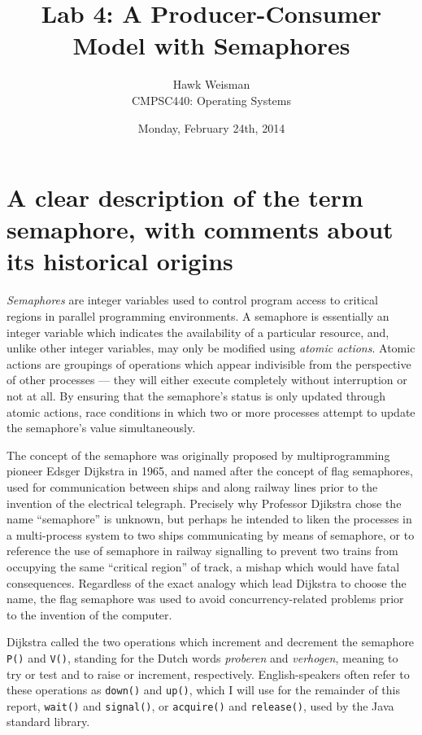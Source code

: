 \documentclass[12pt,a4paper]{article}
\author{Hawk Weisman\\CMPSC440: Operating Systems}
\title{Lab 4: A Producer-Consumer Model with Semaphores}
\date{Monday, February 24th, 2014}
\begin{document}
	\maketitle
	\section{A clear description of the term semaphore, with comments about its historical origins}

		\textit{Semaphores} are integer variables used to control program access to critical regions in parallel programming environments. A semaphore is essentially an integer variable which indicates the availability of a particular resource, and, unlike other integer variables, may only be modified using \textit{atomic actions}. Atomic actions are groupings of operations which appear indivisible from the perspective of other processes --- they will either execute completely without interruption or not at all. By ensuring that the semaphore's status is only updated through atomic actions, race conditions in which two or more processes attempt to update the semaphore's value simultaneously.

		The concept of the semaphore was originally proposed by multiprogramming pioneer Edsger Dijkstra in 1965, and named after the concept of flag semaphores, used for communication between ships and along railway lines prior to the invention of the electrical telegraph. Precisely why Professor Djikstra chose the name ``semaphore'' is unknown, but perhaps he intended to liken the processes in a multi-process system to two ships communicating by means of semaphore, or to reference the use of semaphore in railway signalling to prevent two trains from occupying the same ``critical region'' of track, a mishap which would have fatal consequences. Regardless of the exact analogy which lead Dijkstra to choose the name, the flag semaphore was used to avoid concurrency-related problems prior to the invention of the computer.

		Dijkstra called the two operations which increment and decrement the semaphore \texttt{P()} and \texttt{V()}, standing for the Dutch words \textit{proberen} and \textit{verhogen}, meaning to try or test and to raise or increment, respectively. English-speakers often refer to these operations as \texttt{down()} and \texttt{up()}, which I will use for the remainder of this report, \texttt{wait()} and \texttt{signal()}, or \texttt{acquire()} and \texttt{release()}, used by the Java standard library. 
\end{document}
